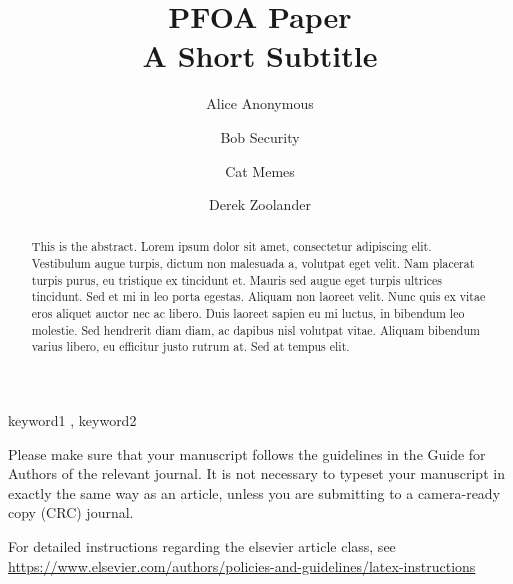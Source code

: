 \documentclass[
  authoryear,
  preprint]{elsarticle}
\begin{document}
\begin{frontmatter}
\title{PFOA Paper \\\large{A Short Subtitle} }
\author[1]{Alice Anonymous%
%
}
\author[2]{Bob Security%
%
}
\author[2]{Cat Memes%
%
}
\author[]{Derek Zoolander%
%
}



        
\begin{abstract}
This is the abstract. Lorem ipsum dolor sit amet, consectetur adipiscing
elit. Vestibulum augue turpis, dictum non malesuada a, volutpat eget
velit. Nam placerat turpis purus, eu tristique ex tincidunt et. Mauris
sed augue eget turpis ultrices tincidunt. Sed et mi in leo porta
egestas. Aliquam non laoreet velit. Nunc quis ex vitae eros aliquet
auctor nec ac libero. Duis laoreet sapien eu mi luctus, in bibendum leo
molestie. Sed hendrerit diam diam, ac dapibus nisl volutpat vitae.
Aliquam bibendum varius libero, eu efficitur justo rutrum at. Sed at
tempus elit.
\end{abstract}





\begin{keyword}
    keyword1 \sep 
    keyword2
\end{keyword}
\end{frontmatter}
    

Please make sure that your manuscript follows the guidelines in the
Guide for Authors of the relevant journal. It is not necessary to
typeset your manuscript in exactly the same way as an article, unless
you are submitting to a camera-ready copy (CRC) journal.

For detailed instructions regarding the elsevier article class, see
\url{https://www.elsevier.com/authors/policies-and-guidelines/latex-instructions}
\end{document}
